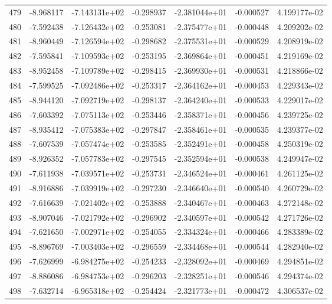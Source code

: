 \begin{tabular}{rrrrrrr}
 479 &  -8.968117 & -7.143131e+02 & -0.298937 & -2.381044e+01 &   -0.000527 &  4.199177e-02 \\
 480 &  -7.592438 & -7.126432e+02 & -0.253081 & -2.375477e+01 &   -0.000448 &  4.209202e-02 \\
 481 &  -8.960449 & -7.126594e+02 & -0.298682 & -2.375531e+01 &   -0.000529 &  4.208919e-02 \\
 482 &  -7.595841 & -7.109593e+02 & -0.253195 & -2.369864e+01 &   -0.000451 &  4.219169e-02 \\
 483 &  -8.952458 & -7.109789e+02 & -0.298415 & -2.369930e+01 &   -0.000531 &  4.218866e-02 \\
 484 &  -7.599525 & -7.092486e+02 & -0.253317 & -2.364162e+01 &   -0.000453 &  4.229343e-02 \\
 485 &  -8.944120 & -7.092719e+02 & -0.298137 & -2.364240e+01 &   -0.000533 &  4.229017e-02 \\
 486 &  -7.603392 & -7.075113e+02 & -0.253446 & -2.358371e+01 &   -0.000456 &  4.239725e-02 \\
 487 &  -8.935412 & -7.075383e+02 & -0.297847 & -2.358461e+01 &   -0.000535 &  4.239377e-02 \\
 488 &  -7.607539 & -7.057474e+02 & -0.253585 & -2.352491e+01 &   -0.000458 &  4.250319e-02 \\
 489 &  -8.926352 & -7.057783e+02 & -0.297545 & -2.352594e+01 &   -0.000538 &  4.249947e-02 \\
 490 &  -7.611938 & -7.039571e+02 & -0.253731 & -2.346524e+01 &   -0.000461 &  4.261125e-02 \\
 491 &  -8.916886 & -7.039919e+02 & -0.297230 & -2.346640e+01 &   -0.000540 &  4.260729e-02 \\
 492 &  -7.616639 & -7.021402e+02 & -0.253888 & -2.340467e+01 &   -0.000463 &  4.272148e-02 \\
 493 &  -8.907046 & -7.021792e+02 & -0.296902 & -2.340597e+01 &   -0.000542 &  4.271726e-02 \\
 494 &  -7.621650 & -7.002971e+02 & -0.254055 & -2.334324e+01 &   -0.000466 &  4.283389e-02 \\
 495 &  -8.896769 & -7.003403e+02 & -0.296559 & -2.334468e+01 &   -0.000544 &  4.282940e-02 \\
 496 &  -7.626999 & -6.984275e+02 & -0.254233 & -2.328092e+01 &   -0.000469 &  4.294851e-02 \\
 497 &  -8.886086 & -6.984753e+02 & -0.296203 & -2.328251e+01 &   -0.000546 &  4.294374e-02 \\
 498 &  -7.632714 & -6.965318e+02 & -0.254424 & -2.321773e+01 &   -0.000472 &  4.306537e-02 \\

\end{tabular}
